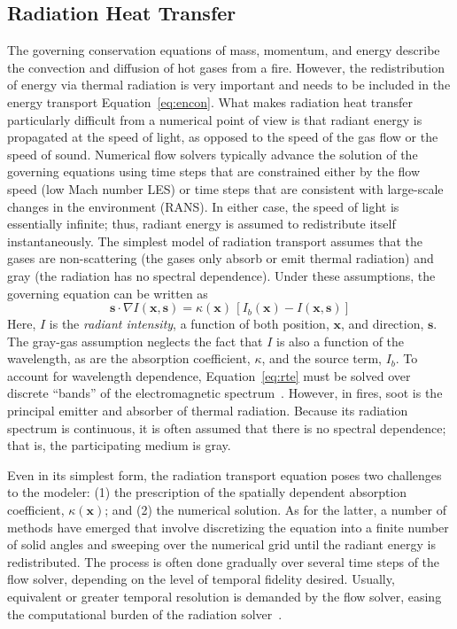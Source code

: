 \documentclass[graybox]{svmult}
\begin{document}
\subsection{Radiation Heat Transfer}

The governing conservation equations of mass, momentum, and energy describe the convection and diffusion of hot gases from a fire. However, the redistribution of energy via thermal radiation is very important and needs to be included in the energy transport Equation~\ref{eq:encon}. What makes radiation heat transfer particularly difficult from a numerical point of view is that radiant energy is propagated at the speed of light, as opposed to the speed of the gas flow or the speed of sound. Numerical flow solvers typically advance the solution of the governing
equations using time steps that are constrained either by the flow speed (low Mach number LES) or time steps that are consistent with large-scale changes in the environment (RANS). In either case, the speed of light is essentially infinite; thus, radiant energy is assumed to redistribute itself instantaneously. The simplest model of radiation transport assumes that the gases are non-scattering (the gases only absorb or emit thermal radiation) and gray (the radiation has no spectral dependence). Under these assumptions, the governing equation can be written as
\begin{equation}
\mathbf{s} \cdot \nabla I(\mathbf{x},\mathbf{s}) = \kappa(\mathbf{x}) \, \left[ I_b(\mathbf{x}) - I(\mathbf{x},\mathbf{s}) \right]
\label{eq:rte}
\end{equation}
Here, $I$ is the {\em radiant intensity}, a function of both position, $\mathbf{x}$, and direction, $\mathbf{s}$. The gray-gas assumption neglects the fact that $I$ is also a function of the wavelength, as are the absorption coefficient, $\kappa$, and the source term, $I_b$. To account for wavelength dependence, Equation~\ref{eq:rte} must be solved over discrete ``bands'' of the electromagnetic spectrum~\cite{Siegel}. However, in fires, soot is the principal emitter and absorber of thermal radiation. Because its radiation spectrum is continuous, it is often assumed that there is no spectral dependence; that is, the participating medium is gray.

Even in its simplest form, the radiation transport equation poses two challenges to the modeler: (1) the prescription of the spatially dependent absorption coefficient, $\kappa(\mathbf{x})$; and (2) the numerical solution. As for  the latter, a number of methods have emerged that involve discretizing the equation into a finite number of solid angles and sweeping over the numerical grid  until the radiant energy is redistributed. The process is often done gradually over several time steps of the flow solver, depending on the level of temporal fidelity desired. Usually, equivalent or greater temporal resolution is demanded by the flow solver, easing the computational burden of the radiation solver~\cite{Hostikka}.
\end{document}
